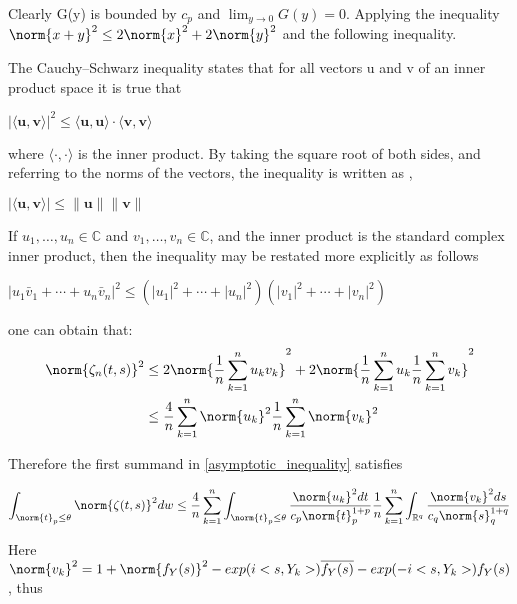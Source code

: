Clearly G(y) is bounded by $c_{p}$ and $\lim_{y\to0}G(y) = 0$. Applying the inequality $\norm{x+y}^{2}\leq2\norm{x}^{2}+2\norm{y}^{2}$ and the following inequality.
\begin{prop}
The Cauchy–Schwarz inequality states that for all vectors u and v of an inner product space it is true that

$|\langle \mathbf {u} ,\mathbf {v} \rangle |^{2}\leq \langle \mathbf {u} ,\mathbf {u} \rangle \cdot \langle \mathbf {v} ,\mathbf {v} \rangle $

where $ \langle \cdot ,\cdot \rangle $ is the inner product. By taking the square root of both sides, and referring to the norms of the vectors, the inequality is written as \cite{C-S-B_inequality1}, \cite{C-S-B_inequality2}

$ |\langle \mathbf {u} ,\mathbf {v} \rangle |\leq \|\mathbf {u} \|\|\mathbf {v} \|$

If $ u_{1},\ldots ,u_{n}\in \mathbb {C} $ and $ v_{1},\ldots ,v_{n}\in \mathbb {C} $, and the inner product is the standard complex inner product, then the inequality may be restated more explicitly as follows 

$ |u_{1}{\bar {v}}_{1}+\cdots +u_{n}{\bar {v}}_{n}|^{2}\leq (|u_{1}|^{2}+\cdots +|u_{n}|^{2})(|v_{1}|^{2}+\cdots +|v_{n}|^{2})$

\end{prop} 

one can obtain that:
\begin{equation}{}
\begin{split}
\norm{\zeta_{n}(t,s)}^{2}&
\leq 2 \norm{\frac{1}{n}\sum_{k=1}^{n}u_{k}v_{k}}^{2} + 2\norm{\frac{1}{n}\sum_{k=1}^{n}u_{k}\frac{1}{n}\sum_{k=1}^{n}v_{k}}^{2} \\
&\leq \frac{4}{n}\sum_{k=1}^{n}\norm{u_{k}}^{2}\frac{1}{n}\sum_{k=1}^{n}\norm{v_{k}}^{2}
\end{split}
\end{equation}\label{eq_conaaazo}

Therefore the first summand in \ref{asymptotic_inequality} satisfies

$$
\int_{\norm{t}_{p}\leq\theta}\norm{\zeta(t,s)}^{2}dw \leq \frac{4}{n}\sum_{k=1}^{n}\int_{\norm{t}_{p}\leq\theta} \frac{\norm{u_{k}}^{2}dt}{c_{p}\norm{t}^{1+p}_{p}}\frac{1}{n}\sum_{k=1}^{n}\int_{\mathbb{R}^{q}}\frac{\norm{v_{k}}^{2}ds}{c_{q}\norm{s}^{1+q}_{q}}
$$

Here $\norm{v_{k}}^{2} = 1 + \norm{f_{Y}(s)}^{2}- exp(i<s,Y_{k}>)\overline{f_{Y}(s)} - exp(-i<s,Y_{k}>)f_{Y}(s)$, thus

